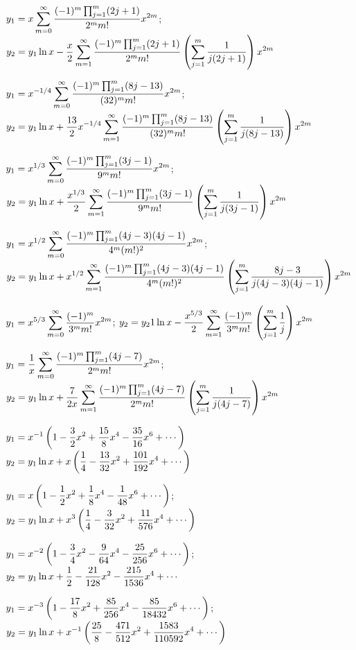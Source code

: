 $\displaystyle{y_1=x\sum_{m=0}^\infty\frac{(-1)^m\prod_{j=1}^m(2j+1)}{2^mm!}
x^{2m}}$;\;
$\displaystyle{y_2=y_1\ln
x-\frac{x}{2}\sum_{m=1}^\infty\frac{(-1)^m\prod_{j=1}^m(2j+1)}{2^mm!}
\left(\sum_{j=1}^m\frac{1}{j(2j+ 1)}\right)x^{2m}}$

$\displaystyle{y_1=x^{-1/4}\sum_{m=0}^\infty\frac{(-1)^m\prod_{j=1}^m(8j-13)}{(32)^mm!}
x^{2m}}$;\;
$\displaystyle{y_2=y_1\ln
x+\frac{13}{2}x^{-1/4}\sum_{m=1}^\infty\frac{(-1)^m\prod_{j=1}^m(8j-13)}{(32)^mm!}
\left(\sum_{j=1}^m\frac{1}{j(8j-13)}\right)x^{2m}}$

$\displaystyle{y_1=x^{1/3}\sum_{m=0}^\infty\frac{(-1)^m\prod_{j=1}^m(3j-1)}{9^mm!}
x^{2m}}$;\;
$\displaystyle{y_2=y_1\ln
x+\frac{x^{1/3}}{2}\sum_{m=1}^\infty\frac{(-1)^m\prod_{j=1}^m(3j-1)}{9^mm!}
\left(\sum_{j=1}^m\frac{1}{j(3j-1)}\right)x^{2m}}$

$\displaystyle{y_1=x^{1/2}\sum_{m=0}^\infty\frac{(-1)^m\prod_{j=1}^m(4j-3)(4j-1)}{4^m(m!)^2}
x^{2m}}$;\;
$\displaystyle{y_2=y_1\ln
x+x^{1/2}\sum_{m=1}^\infty\frac{(-1)^m\prod_{j=1}^m(4j-3)(4j-1)}{4^m(m!)^2}
\left(\sum_{j=1}^m\frac{8j-3}{j(4j-3) (4j-1)}\right)x^{2m}}$

$\displaystyle{y_1=x^{5/3}\sum_{m=0}^\infty\frac{(-1)^m}{3^mm!}x^{2m}}$;\;
$\displaystyle{y_2=y_21\ln
x-\frac{x^{5/3}}{2}\sum_{m=1}^\infty\frac{(-1)^m}{3^mm!}\left(\sum_{j=1}^m\frac{1}{j}\right)x^{2m}}$\;

$\displaystyle{y_1=\frac{1}{x}\sum_{m=0}^\infty\frac{(-1)^m\prod_{j=1}^m(4j-7)}{2^mm!} x^{2m}}$;\;
$\displaystyle{y_2=y_1\ln
x+\frac{7}{2x}\sum_{m=1}^\infty\frac{(-1)^m\prod_{j=1}^m(4j-7)}{2^mm!}
\left(\sum_{j=1}^m\frac{1}{j(4j-7)}\right)x^{2m}}$

$\displaystyle{y_1=x^{-1}\left(1-\frac{3}{2}x^2+\frac{15}{8}x^4-\frac{35}{16}x^6+\cdots\right)}$
$\displaystyle{y_2=y_1\ln
x+x\left(\frac{1}{4}-\frac{13}{32}x^2+\frac{101}{192}x^4
+\cdots\right)}$

$\displaystyle{y_1=x\left(1-\frac{1}{2}x^2+\frac{1}{8}x^4-\frac{1}{48}x^6+\cdots\right)}$;\;
$\displaystyle{y_2=y_1 \ln x+x^3\left(\frac{1}{4}-\frac{3}{32}x^2+
\frac{11}{576}x^4+\cdots\right)}$

$\displaystyle{y_1=x^{-2}\left(1-\frac{3}{4}x^2-\frac{9}{64}x^4-\frac{25}{256}x^6
+\cdots\right)}$;\;
$\displaystyle{y_2=y_1\ln x+\frac{1}{2}-\frac{21}{128}x^2-\frac{215}{1536}x^4+\cdots}$

$\displaystyle{y_1=x^{-3}\left(1-\frac{17}{8}x^2+\frac{85}{256}x^4-\frac{85}{18432}x^6+\cdots\right)}$;\;
$\displaystyle{y_2=y_1\ln x
+x^{-1}\left(\frac{25}{8}-\frac{471}{512}x^2+\frac{1583}{110592}x^4
+\cdots\right)}$

